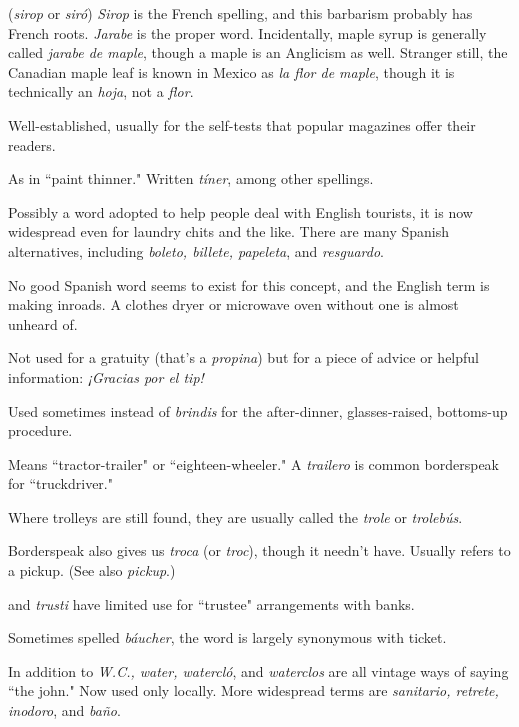  (\emph{sirop} or \emph{siró}) \emph{Sirop} is the French spelling, and this
barbarism probably has French roots. \emph{Jarabe} is the proper word. Incidentally, maple syrup is generally called \emph{jarabe de maple}, though a
maple is an Anglicism as well. Stranger still, the Canadian maple leaf
is known in Mexico as \emph{la flor de maple}, though it is technically an
\emph{hoja}, not a \emph{flor}.

 Well-established, usually for the self-tests that popular
magazines offer their readers.

 As in ``paint thinner." Written \emph{tíner}, among other
spellings.

 Possibly a word adopted to help people deal with English tourists, it is now widespread even for laundry chits and the like.
There are many Spanish alternatives, including \emph{boleto, billete, papeleta}, and \emph{resguardo}.

 No good Spanish word seems to exist for this concept,
and the English term is making inroads. A clothes dryer or microwave
oven without one is almost unheard of.

 Not used for a gratuity (that's a \emph{propina}) but for a piece of
advice or helpful information: \emph{¡Gracias por el tip!}

 Used sometimes instead of \emph{brindis} for the after-dinner, glasses-raised, bottoms-up procedure.

 Means ``tractor-trailer" or ``eighteen-wheeler." A
\emph{trailero} is common borderspeak for ``truckdriver."

 Where trolleys are still found, they are usually
called the \emph{trole} or \emph{trolebús}.

 Borderspeak also gives us \emph{troca} (or \emph{troc}), though it
needn't have. Usually refers to a pickup. (See also \emph{pickup}.)

 and \emph{trusti} have limited use for
``trustee" arrangements with banks.

 Sometimes spelled \emph{báucher}, the word is largely
synonymous with ticket.

 In addition to \emph{W.C., water, watercló}, and \emph{waterclos} are
all vintage ways of saying ``the john." Now used only locally. More
widespread terms are \emph{sanitario, retrete, inodoro}, and \emph{baño}.

